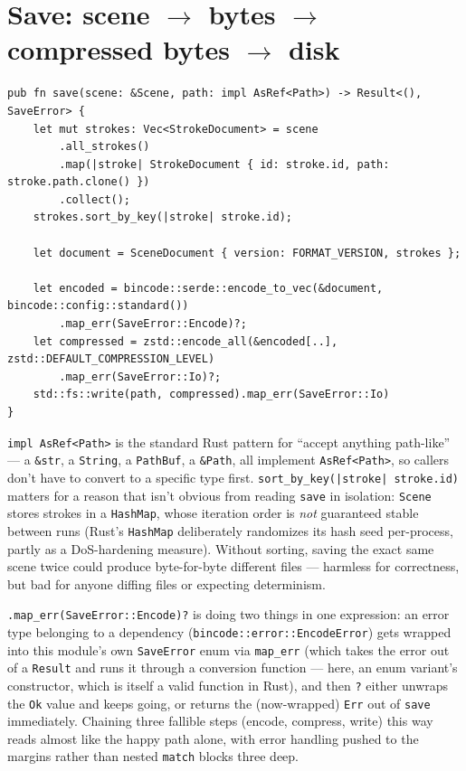 \documentclass[11pt]{article}
\begin{document}
\section{Save: scene \texorpdfstring{$\to$}{->} bytes \texorpdfstring{$\to$}{->} compressed bytes \texorpdfstring{$\to$}{->} disk}
\begin{lstlisting}
pub fn save(scene: &Scene, path: impl AsRef<Path>) -> Result<(), SaveError> {
    let mut strokes: Vec<StrokeDocument> = scene
        .all_strokes()
        .map(|stroke| StrokeDocument { id: stroke.id, path: stroke.path.clone() })
        .collect();
    strokes.sort_by_key(|stroke| stroke.id);

    let document = SceneDocument { version: FORMAT_VERSION, strokes };

    let encoded = bincode::serde::encode_to_vec(&document, bincode::config::standard())
        .map_err(SaveError::Encode)?;
    let compressed = zstd::encode_all(&encoded[..], zstd::DEFAULT_COMPRESSION_LEVEL)
        .map_err(SaveError::Io)?;
    std::fs::write(path, compressed).map_err(SaveError::Io)
}
\end{lstlisting}
\texttt{impl AsRef<Path>} is the standard Rust pattern for ``accept anything path-like'' —
a \texttt{\&str}, a \texttt{String}, a \texttt{PathBuf}, a \texttt{\&Path}, all implement
\texttt{AsRef<Path>}, so callers don't have to convert to a specific type first.
\texttt{sort\_by\_key(|stroke| stroke.id)} matters for a reason that isn't obvious from
reading \texttt{save} in isolation: \texttt{Scene} stores strokes in a \texttt{HashMap},
whose iteration order is \emph{not} guaranteed stable between runs (Rust's
\texttt{HashMap} deliberately randomizes its hash seed per-process, partly as a
DoS-hardening measure). Without sorting, saving the exact same scene twice could produce
byte-for-byte different files — harmless for correctness, but bad for anyone diffing
files or expecting determinism.

\texttt{.map\_err(SaveError::Encode)?} is doing two things in one expression: an error
type belonging to a dependency (\texttt{bincode::error::EncodeError}) gets wrapped into
this module's own \texttt{SaveError} enum via \texttt{map\_err} (which takes the error out
of a \texttt{Result} and runs it through a conversion function — here, an enum variant's
constructor, which is itself a valid function in Rust), and then \texttt{?} either unwraps
the \texttt{Ok} value and keeps going, or returns the (now-wrapped) \texttt{Err} out of
\texttt{save} immediately. Chaining three fallible steps (encode, compress, write) this way
reads almost like the happy path alone, with error handling pushed to the margins rather
than nested \texttt{match} blocks three deep.
\end{document}
